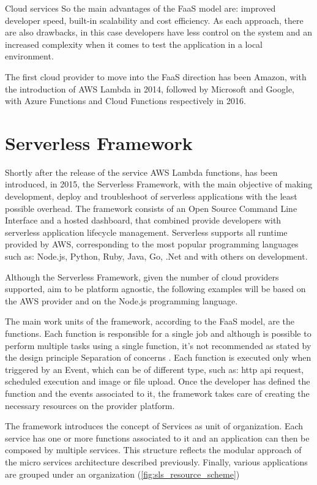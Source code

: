\begin{chapter}{Cloud services}
    So the main advantages of the FaaS model are: improved developer speed, built-in
    scalability and cost efficiency. As each approach, there are also drawbacks, in
    this case developers have less control on the system and an increased complexity when it
    comes to test the application in a local environment.

    The first cloud provider to move into the FaaS direction has been Amazon, with
    the introduction of AWS Lambda in 2014, followed by Microsoft and Google, with
    Azure Functions and Cloud Functions respectively in 2016.

    \section{Serverless Framework}
    \label{sec:serverless_framework}
    Shortly after the release of the service AWS Lambda functions, has been introduced,
    in 2015, the Serverless Framework, with the main objective of making development,
    deploy and troubleshoot of serverless applications with the least possible overhead.
    The framework consists of an Open Source Command Line Interface and a hosted
    dashboard, that combined provide developers with serverless application lifecycle
    management. Serverless supports all runtime provided by AWS, corresponding to
    the most popular programming languages such as: Node.js, Python, Ruby, Java,
    Go, .Net and with others on development.

    Although the Serverless Framework, given the number of cloud providers supported,
    aim to be platform agnostic, the following examples will be based on the AWS
    provider and on the Node.js programming language.

    The main work units of the framework, according to the FaaS model, are the functions.
    Each function is responsible for a single job and although is possible to perform
    multiple tasks using a single function, it's not recommended as stated by the
    design principle Separation of concerns \cite{separation_of_concerns}.
    Each function is executed only when triggered by an Event, which can be of different
    type, such as: http api request, scheduled execution and image or file upload.
    Once the developer has defined the function and the events associated to it,
    the framework takes care of creating the necessary resources on the provider platform.

    The framework introduces the concept of Services as unit of organization. Each
    service has one or more functions associated to it and an application can then
    be composed by multiple services. This structure reflects the modular approach
    of the micro services architecture described previously. Finally, various applications
    are grouped under an organization (\ref{fig:sls_resource_scheme})


\end{chapter}
